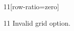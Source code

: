 \documentclass[paper=A4]{ropas-poster}
\begin{document}
\begin{postergrid}{1}{1}[row-ratio={zero}]
\begin{posterblock}{1}{1}
Invalid grid option.
\end{posterblock}
\end{postergrid}
\end{document}
